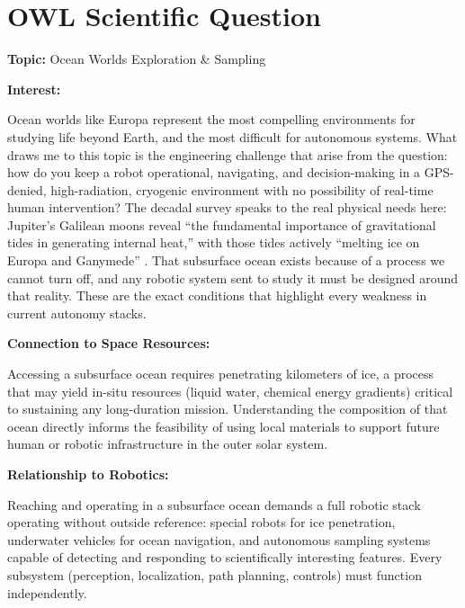 \documentclass[11pt]{article}
\begin{document}
\section*{OWL Scientific Question}

\noindent\textbf{Topic:} Ocean Worlds Exploration \& Sampling \cite[pp.~36--39]{owlDecadal}

\noindent\textbf{Interest:}

Ocean worlds like Europa represent the most compelling environments for studying life beyond Earth,
and the most difficult for autonomous systems. What draws me to this topic is the engineering challenge that arise from the question:
how do you keep a robot operational, navigating, and decision-making in a GPS-denied, high-radiation, cryogenic environment with no possibility of
real-time human intervention? The decadal survey speaks to the real physical needs here: Jupiter's Galilean moons reveal
``the fundamental importance of gravitational tides in generating internal heat,'' with those tides actively ``melting ice on Europa and
Ganymede'' \cite[p.~37]{owlDecadal}. That subsurface ocean exists because of a process we cannot turn off, and any
robotic system sent to study it must be designed around that reality. These are the exact conditions that highlight every weakness in current autonomy stacks.

\noindent\textbf{Connection to Space Resources:}

Accessing a subsurface ocean requires penetrating kilometers of ice, a process that may yield
in-situ resources (liquid water, chemical energy gradients) critical to sustaining any long-duration mission. Understanding the composition of that ocean
directly informs the feasibility of using local materials to support future human or robotic infrastructure in the outer solar system.

\noindent\textbf{Relationship to Robotics:}

Reaching and operating in a subsurface ocean demands a full robotic stack operating without outside reference:
special robots for ice penetration, underwater vehicles for ocean navigation, and autonomous sampling systems capable of detecting and responding to scientifically
interesting features. Every subsystem (perception, localization, path planning, controls) must function independently.


\end{document}
